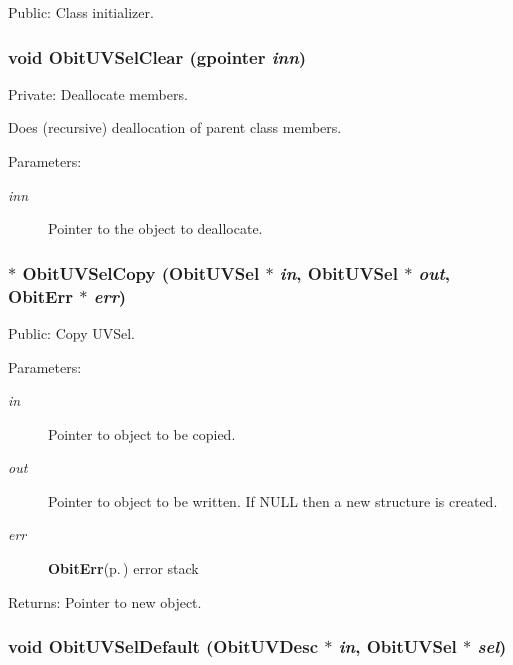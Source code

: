 Public: Class initializer. 

\subsubsection{\setlength{\rightskip}{0pt plus 5cm}void Obit\-UVSel\-Clear (gpointer {\em inn})}\label{ObitUVSel_8c_a4}


Private: Deallocate members. 

Does (recursive) deallocation of parent class members. \begin{Desc}
\item[Parameters:]
\begin{description}
\item[{\em inn}]Pointer to the object to deallocate. \end{description}
\end{Desc}
\subsubsection{$\ast$ Obit\-UVSel\-Copy ({\bf Obit\-UVSel} $\ast$ {\em in}, {\bf Obit\-UVSel} $\ast$ {\em out}, {\bf Obit\-Err} $\ast$ {\em err})}\label{ObitUVSel_8c_a9}


Public: Copy UVSel. 

\begin{Desc}
\item[Parameters:]
\begin{description}
\item[{\em in}]Pointer to object to be copied. \item[{\em out}]Pointer to object to be written. If NULL then a new structure is created. \item[{\em err}]{\bf Obit\-Err}{\rm (p.\,\pageref{structObitErr})} error stack \end{description}
\end{Desc}
\begin{Desc}
\item[Returns:]Pointer to new object. \end{Desc}
\subsubsection{\setlength{\rightskip}{0pt plus 5cm}void Obit\-UVSel\-Default ({\bf Obit\-UVDesc} $\ast$ {\em in}, {\bf Obit\-UVSel} $\ast$ {\em sel})}\label{ObitUVSel_8c_a11}


